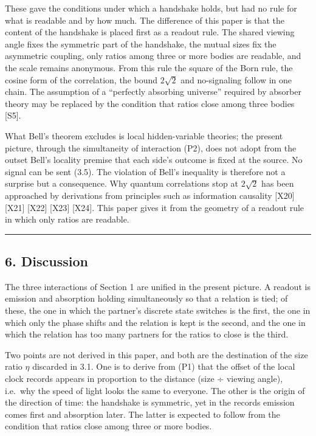 \documentclass[
  a4paper,
]{article}
\begin{document}
These gave the conditions under which a handshake holds, but had no rule
for what is readable and by how much. The difference of this paper is
that the content of the handshake is placed first as a readout rule. The
shared viewing angle fixes the symmetric part of the handshake, the
mutual sizes fix the asymmetric coupling, only ratios among three or
more bodies are readable, and the scale remains anonymous. From this
rule the square of the Born rule, the cosine form of the correlation,
the bound \(2\sqrt{2}\) and no-signaling follow in one chain. The
assumption of a ``perfectly absorbing universe'' required by absorber
theory may be replaced by the condition that ratios close among three
bodies {[}S5{]}.

What Bell's theorem excludes is local hidden-variable theories; the
present picture, through the simultaneity of interaction (P2), does not
adopt from the outset Bell's locality premise that each side's outcome
is fixed at the source. No signal can be sent (3.5). The violation of
Bell's inequality is therefore not a surprise but a consequence. Why
quantum correlations stop at \(2\sqrt{2}\) has been approached by
derivations from principles such as information causality {[}X20{]}
{[}X21{]} {[}X22{]} {[}X23{]} {[}X24{]}. This paper gives it from the
geometry of a readout rule in which only ratios are readable.

\begin{center}\rule{0.5\linewidth}{0.5pt}\end{center}

\subsection{6. Discussion}\label{discussion}

The three interactions of Section 1 are unified in the present picture.
A readout is emission and absorption holding simultaneously so that a
relation is tied; of these, the one in which the partner's discrete
state switches is the first, the one in which only the phase shifts and
the relation is kept is the second, and the one in which the relation
has too many partners for the ratios to close is the third.

Two points are not derived in this paper, and both are the destination
of the size ratio \(\eta\) discarded in 3.1. One is to derive from (P1)
that the offset of the local clock records appears in proportion to the
distance (size ÷ viewing angle), i.e.~why the speed of light looks the
same to everyone. The other is the origin of the direction of time: the
handshake is symmetric, yet in the records emission comes first and
absorption later. The latter is expected to follow from the condition
that ratios close among three or more bodies.
\end{document}
